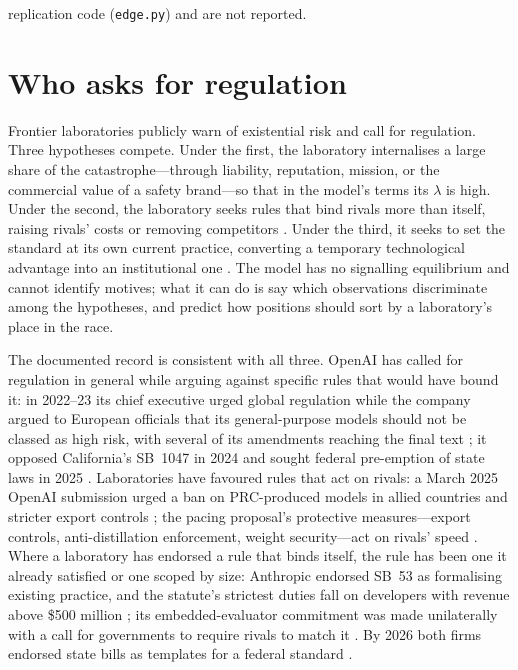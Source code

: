 \documentclass[11pt]{article}
\theoremstyle{plain}
\theoremstyle{definition}
\theoremstyle{remark}
\begin{document}
replication code (\texttt{edge.py}) and are not reported.

\section{Who asks for regulation}

Frontier laboratories publicly warn of existential risk and call for regulation. Three hypotheses compete. Under the first, the laboratory internalises a large share of the catastrophe---through liability, reputation, mission, or the commercial value of a safety brand---so that in the model's terms its $\lambda$ is high. Under the second, the laboratory seeks rules that bind rivals more than itself, raising rivals' costs or removing competitors \citep{stigler1971,salop1983,yandle1983}. Under the third, it seeks to set the standard at its own current practice, converting a temporary technological advantage into an institutional one \citep{cset2025}. The model has no signalling equilibrium and cannot identify motives; what it can do is say which observations discriminate among the hypotheses, and predict how positions should sort by a laboratory's place in the race.

The documented record is consistent with all three. OpenAI has called for regulation in general while arguing against specific rules that would have bound it: in 2022--23 its chief executive urged global regulation while the company argued to European officials that its general-purpose models should not be classed as high risk, with several of its amendments reaching the final text \citep{perrigo2023}; it opposed California's SB~1047 in 2024 and sought federal pre-emption of state laws in 2025 \citep{fli2025,implicator2026}. Laboratories have favoured rules that act on rivals: a March 2025 OpenAI submission urged a ban on PRC-produced models in allied countries and stricter export controls \citep{wiggers2025}; the pacing proposal's protective measures---export controls, anti-distillation enforcement, weight security---act on rivals' speed \citep{amodei2026}. Where a laboratory has endorsed a rule that binds itself, the rule has been one it already satisfied or one scoped by size: Anthropic endorsed SB~53 as formalising existing practice, and the statute's strictest duties fall on developers with revenue above \$500 million \citep{anthropic2025sb53,brookings2026}; its embedded-evaluator commitment was made unilaterally with a call for governments to require rivals to match it \citep{amodei2026}. By 2026 both firms endorsed state bills as templates for a federal standard \citep{hill2026}.
\end{document}
